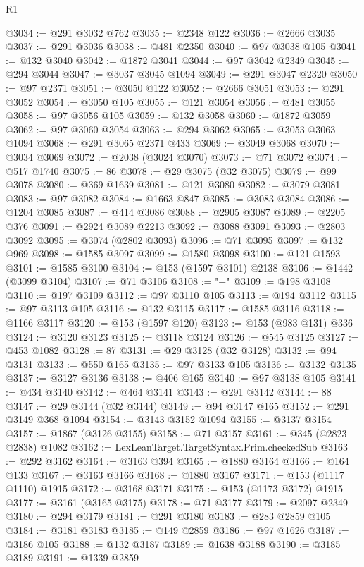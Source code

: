 \begin{lexlean}{R1}
\begin{coremodule}
{{{{{{{{{{{{{{{{{{{{{{{{{{{{{{{{{{{{{{{{{{{{{{{{{{{{{{{{{{{{{{{{{{{{{{{{{{{{{{{{{{{{{{{{{{{{{{{{{{{{{{{{{{{{{{{{{{{{{{{{{{{{{{{{{{{{{{{{{{{{{{{{{{{{{{{{{{{{{{{{{{{{{{{{{{{{{{{{{{{{{{{{{{@3034 := @291 @3032 @762
@3035 := @2348 @122
@3036 := @2666 @3035
@3037 := @291 @3036
@3038 := @481 @2350
@3040 := @97 @3038 @105
@3041 := @132 @3040
@3042 := @1872 @3041
@3044 := @97 @3042 @2349
@3045 := @294 @3044
@3047 := @3037 @3045 @1094
@3049 := @291 @3047 @2320
@3050 := @97 @2371
@3051 := @3050 @122
@3052 := @2666 @3051
@3053 := @291 @3052
@3054 := @3050 @105
@3055 := @121 @3054
@3056 := @481 @3055
@3058 := @97 @3056 @105
@3059 := @132 @3058
@3060 := @1872 @3059
@3062 := @97 @3060 @3054
@3063 := @294 @3062
@3065 := @3053 @3063 @1094
@3068 := @291 @3065 @2371 @433
@3069 := @3049 @3068
@3070 := @3034 @3069
@3072 := @2038 (@3024 @3070)
@3073 := @71 @3072
@3074 := @517 @1740
@3075 := 86
@3078 := @29 @3075 (@32 @3075)
@3079 := @99 @3078
@3080 := @369 @1639
@3081 := @121 @3080
@3082 := @3079 @3081
@3083 := @97 @3082
@3084 := @1663 @847
@3085 := @3083 @3084
@3086 := @1204 @3085
@3087 := @414 @3086
@3088 := @2905 @3087
@3089 := @2205 @376
@3091 := @2924 @3089 @2213
@3092 := @3088 @3091
@3093 := @2803 @3092
@3095 := @3074 (@2802 @3093)
@3096 := @71 @3095
@3097 := @132 @969
@3098 := @1585 @3097
@3099 := @1580 @3098
@3100 := @121 @1593
@3101 := @1585 @3100
@3104 := @153 (@1597 @3101) @2138
@3106 := @1442 (@3099 @3104)
@3107 := @71 @3106
@3108 := "+"
@3109 := @198 @3108
@3110 := @197 @3109
@3112 := @97 @3110 @105
@3113 := @194 @3112
@3115 := @97 @3113 @105
@3116 := @132 @3115
@3117 := @1585 @3116
@3118 := @1166 @3117
@3120 := @153 (@1597 @120)
@3123 := @153 (@983 @131) @336
@3124 := @3120 @3123
@3125 := @3118 @3124
@3126 := @545 @3125
@3127 := @453 @1082
@3128 := 87
@3131 := @29 @3128 (@32 @3128)
@3132 := @94 @3131
@3133 := @550 @165
@3135 := @97 @3133 @105
@3136 := @3132 @3135
@3137 := @3127 @3136
@3138 := @406 @165
@3140 := @97 @3138 @105
@3141 := @434 @3140
@3142 := @464 @3141
@3143 := @291 @3142
@3144 := 88
@3147 := @29 @3144 (@32 @3144)
@3149 := @94 @3147 @165
@3152 := @291 @3149 @368 @1094
@3154 := @3143 @3152 @1094
@3155 := @3137 @3154
@3157 := @1867 (@3126 @3155)
@3158 := @71 @3157
@3161 := @345 (@2823 @2838) @1082
@3162 := LexLeanTarget.TargetSyntax.Prim.checkedSub
@3163 := @292 @3162
@3164 := @3163 @394
@3165 := @1880 @3164
@3166 := @164 @133
@3167 := @3163 @3166
@3168 := @1880 @3167
@3171 := @153 (@1117 @1110) @1915
@3172 := @3168 @3171
@3175 := @153 (@1173 @3172) @1915
@3177 := @3161 (@3165 @3175)
@3178 := @71 @3177
@3179 := @2097 @2349
@3180 := @294 @3179
@3181 := @291 @3180
@3183 := @283 @2859 @105
@3184 := @3181 @3183
@3185 := @149 @2859
@3186 := @97 @1626
@3187 := @3186 @105
@3188 := @132 @3187
@3189 := @1638 @3188
@3190 := @3185 @3189
@3191 := @1339 @2859
}}}}}}}}}}}}}}}}}}}}}}}}}}}}}}}}}}}}}}}}}}}}}}}}}}}}}}}}}}}}}}}}}}}}}}}}}}}}}}}}}}}}}}}}}}}}}}}}}}}}}}}}}}}}}}}}}}}}}}}}}}}}}}}}}}}}}}}}}}}}}}}}}}}}}}}}}}}}}}}}}}}}}}}}}}}}}}}}}}}}}}}}}}
\end{coremodule}
\end{lexlean}
